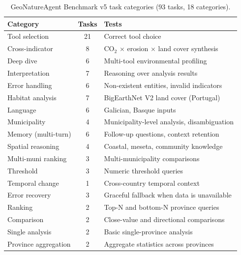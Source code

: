 \documentclass[sigconf]{acmart}
\begin{document}
\begin{table}[ht]
    \caption{GeoNatureAgent Benchmark v5 task categories (93 tasks, 18 categories).}
    \label{tab:categories}
    \centering
    \begin{tabular}{lcp{3.9cm}}
        \toprule
        \textbf{Category} & \textbf{Tasks} & \textbf{Tests} \\
        \midrule
        Tool selection         & 21 & Correct tool choice\\
        Cross-indicator        &  8 & CO$_2$ $\times$ erosion $\times$ land cover synthesis \\
        Deep dive              &  6 & Multi-tool environmental profiling \\
        Interpretation         &  7 & Reasoning over analysis results \\
        Error handling         &  6 & Non-existent entities, invalid indicators \\
        Habitat analysis       &  7 & BigEarthNet V2 land cover (Portugal) \\
        Language               &  6 & Galician, Basque inputs \\
        Municipality           &  4 & Municipality-level analysis, disambiguation \\
        Memory (multi-turn)    &  6 & Follow-up questions, context retention \\
        Spatial reasoning      &  4 & Coastal, meseta, community knowledge \\
        Multi-muni ranking     &  3 & Multi-municipality comparisons \\
        Threshold              &  3 & Numeric threshold queries \\
        Temporal change        &  1 & Cross-country temporal context \\
        Error recovery         &  3 & Graceful fallback when data is unavailable \\
        Ranking                &  2 & Top-N and bottom-N province queries \\
        Comparison             &  2 & Close-value and directional comparisons \\
        Single analysis        &  2 & Basic single-province analysis \\
        Province aggregation   &  2 & Aggregate statistics across provinces \\
        \bottomrule
    \end{tabular}
\end{table}
\end{document}
